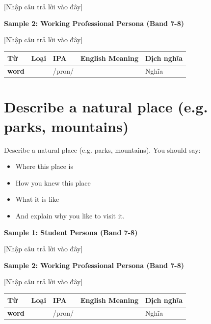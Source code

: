 [Nhập câu trả lời vào đây]

\textbf{Sample 2: Working Professional Persona (Band 7-8)}

[Nhập câu trả lời vào đây]

\separator


\vspace{0.8em}
\begin{center}
\renewcommand{\arraystretch}{1.65}
\begin{tabularx}{\textwidth}{|V{0.22\textwidth}|C{0.07\textwidth}|I{0.20\textwidth}|Y|V{0.18\textwidth}|}
\hline
{}
\textbf{Từ} & \textbf{Loại} & \textbf{IPA} & \textbf{English Meaning} & \textbf{Dịch nghĩa} \\
\hline
\textbf{word} & & /pron/ & & Nghĩa \\ \hline
\end{tabularx}
\end{center}

\newpage

\section{Describe a natural place (e.g. parks, mountains)}
\begin{ieltsprompt}
Describe a natural place (e.g. parks, mountains).
You should say:
\begin{itemize}[leftmargin=2em, itemsep=2pt]
\item Where this place is
\item How you knew this place
\item What it is like
\item And explain why you like to visit it.
\end{itemize}
\end{ieltsprompt}
\begin{ieltsanswer}
\textbf{Sample 1: Student Persona (Band 7-8)}

[Nhập câu trả lời vào đây]

\textbf{Sample 2: Working Professional Persona (Band 7-8)}

[Nhập câu trả lời vào đây]
\end{ieltsanswer}


\vspace{0.8em}
\begin{center}
\renewcommand{\arraystretch}{1.65}
\begin{tabularx}{\textwidth}{|V{0.22\textwidth}|C{0.07\textwidth}|I{0.20\textwidth}|Y|V{0.18\textwidth}|}
\hline
{}
\textbf{Từ} & \textbf{Loại} & \textbf{IPA} & \textbf{English Meaning} & \textbf{Dịch nghĩa} \\
\hline
\textbf{word} & & /pron/ & & Nghĩa \\ \hline
\end{tabularx}
\end{center}

